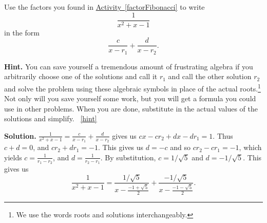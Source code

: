 \documentclass{book}
\begin{document}
\setcounter{project}{268}
\addtocounter{project}{-1}
\begin{activity}[]\label{fractionFibonacci}
\hypertarget{p-1383}{}%
Use the factors you found in \hyperref[factorFibonacci]{Activity~\ref{factorFibonacci}} to write%
\begin{equation*}
\frac{1}{x^2+x-1}
\end{equation*}
in the form%
\begin{equation*}
\frac{c}{x-r_1} + \frac{d}{x-r_2}.
\end{equation*}
%
\par\smallskip%
\noindent\textbf{Hint.}\hypertarget{hint-171}{}\quad%
\hypertarget{p-1384}{}%
You can save yourself a tremendous amount of frustrating algebra if you arbitrarily choose one of the solutions and call it \(r_1\) and call the other solution \(r_2\) and solve the problem using these algebraic symbols in place of the actual roots.\footnote{We use the words roots and solutions interchangeably.\label{fn-18}} Not only will you save yourself some work, but you will get a formula you could use in other problems. When you are done, substitute in the actual values of the solutions and simplify.%
~\hfill{\tiny\hyperlink{a-268}{[hint]}\hypertarget{q-268}{}}\par\smallskip%
\noindent\textbf{Solution.}\hypertarget{solution-170}{}\quad%
\hypertarget{p-1385}{}%
\(\frac{1}{x^2+x-1}=\frac{c}{x-r_1}+\frac{d}{x-r_2}\) gives us \(cx-cr_2+dx-dr_1=1\). Thus \(c+d=0\), and \(cr_2+dr_1 =-1\). This gives us \(d=-c\) and so \(cr_2-cr_1=-1\), which yields \(c=\frac{1}{r_1-r_2}\), and \(d=\frac{1}{r_2-r_1}\). By substitution, \(c=1/\sqrt{5}\) and \(d=-1/\sqrt{5}\). This gives us%
\begin{equation*}
\frac{1}{x^2+x-1} = \frac{1/\sqrt{5}}{x-\frac{-1+\sqrt{5}}{2}}
+ \frac{-1/\sqrt{5}}{x- \frac{-1-\sqrt{5}}{2}}\text{.}
\end{equation*}
%
\end{activity}

\clearpage
\end{document}
